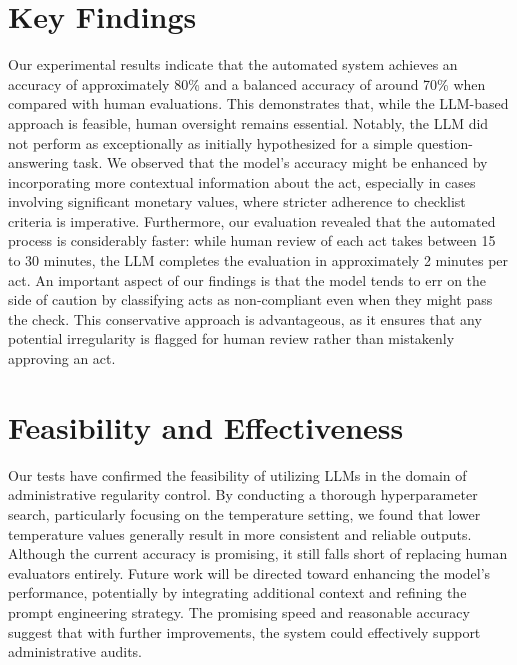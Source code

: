 \documentclass[../main.tex]{subfiles}
\begin{document}
\section*{Key Findings}
Our experimental results indicate that the automated system achieves an accuracy of approximately 80\% and a balanced accuracy of around 70\% when compared with human evaluations. This demonstrates that, while the LLM-based approach is feasible, human oversight remains essential. Notably, the LLM did not perform as exceptionally as initially hypothesized for a simple question-answering task. We observed that the model's accuracy might be enhanced by incorporating more contextual information about the act, especially in cases involving significant monetary values, where stricter adherence to checklist criteria is imperative. Furthermore, our evaluation revealed that the automated process is considerably faster: while human review of each act takes between 15 to 30 minutes, the LLM completes the evaluation in approximately 2 minutes per act. An important aspect of our findings is that the model tends to err on the side of caution by classifying acts as non-compliant even when they might pass the check. This conservative approach is advantageous, as it ensures that any potential irregularity is flagged for human review rather than mistakenly approving an act.

\section*{Feasibility and Effectiveness}
Our tests have confirmed the feasibility of utilizing LLMs in the domain of administrative regularity control. By conducting a thorough hyperparameter search, particularly focusing on the temperature setting, we found that lower temperature values generally result in more consistent and reliable outputs. Although the current accuracy is promising, it still falls short of replacing human evaluators entirely. Future work will be directed toward enhancing the model's performance, potentially by integrating additional context and refining the prompt engineering strategy. The promising speed and reasonable accuracy suggest that with further improvements, the system could effectively support administrative audits.
\end{document}
